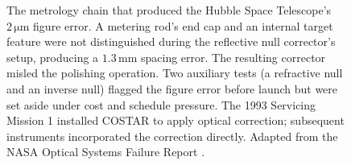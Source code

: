\begin{figure}[htbp]
\begin{tikzpicture}
\end{tikzpicture}
\caption[Hubble primary-mirror metrology chain]{The metrology chain
that produced the Hubble Space Telescope's $2\,\si{\micro\meter}$
figure error. A metering rod's end cap and an internal target feature
were not distinguished during the reflective null corrector's setup,
producing a $1.3 \,\si{\milli\meter}$ spacing error. The resulting
corrector misled the polishing operation. Two auxiliary tests (a
refractive null and an inverse null) flagged the figure error before
launch but were set aside under cost and schedule pressure. The 1993
Servicing Mission 1 installed COSTAR to apply optical correction;
subsequent instruments incorporated the correction directly. Adapted
from the NASA Optical Systems Failure Report
\cite{acc:nasa-hubble-optical-systems-1990}.}
\label{fig:vol01:ch02:hubble-mirror}
\end{figure}
